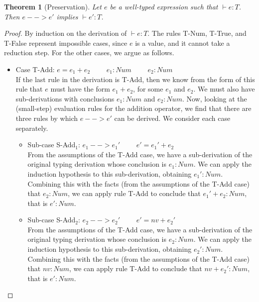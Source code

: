 \documentclass[tese,capa,english]{texufpel}
\newtheorem{theorem}{Theorem}
\begin{document}
\begin{theorem}[Preservation]
Let $e$ be a well-typed expression such that $\vdash e : T$. Then $e --> e'$ implies $\vdash e' : T$.
\end{theorem}

\begin{proof}
  By induction on the derivation of $\vdash e : T$. The rules {\footnotesize\textrm{T-Num}}, {\footnotesize\textrm{T-True}}, and {\footnotesize\textrm{T-False}} represent impossible cases, since $e$ is a value, and it cannot take a reduction step. For the other cases, we argue as follows.
\begin{itemize}
\item Case {\footnotesize\textrm{T-Add}}: $e = e_1 + e_2$ \ \ \ \ $e_1 : Num$ \ \ \ \ $e_2 : Num$ \vspace{5pt} \\
If the last rule in the derivation is {\footnotesize\textrm{T-Add}}, then we know from the form of this rule that $e$ must have the form $e_1 + e_2$, for some $e_1$ and $e_2$. We must also have sub-derivations with conclusions $e_1 : Num$ and $e_2 : Num$. Now, looking at the (small-step) evaluation rules for the addition operator, we find that there are three rules by which $e --> e'$ can be derived. We consider each case separately.
\begin{itemize}
\item Sub-case {\footnotesize\textrm{S-Add$_1$}}: $e_1 --> e_1'$ \ \ \ \ $e' = e_1' + e_2$ \vspace{4pt} \\
From the assumptions of the {\footnotesize\textrm{T-Add}} case, we have a sub-derivation of the original typing derivation whose conclusion is $e_1 : Num$. We can apply the induction hypothesis to this sub-derivation, obtaining $e_1' : Num$. Combining this with the facts (from the assumptions of the {\footnotesize\textrm{T-Add}} case) that $e_2 : Num$, we can apply rule {\footnotesize\textrm{T-Add}} to conclude that $e_1' + e_2 : Num$, that is $e' : Num$.
\item Sub-case {\footnotesize\textrm{S-Add$_2$}}: $e_2 --> e_2'$ \ \ \ \ $e' = nv + e_2'$ \vspace{4pt} \\
From the assumptions of the {\footnotesize\textrm{T-Add}} case, we have a sub-derivation of the original typing derivation whose conclusion is $e_2 : Num$. We can apply the induction hypothesis to this sub-derivation, obtaining $e_2' : Num$. Combining this with the facts (from the assumptions of the {\footnotesize\textrm{T-Add}} case) that $nv : Num$, we can apply rule {\footnotesize\textrm{T-Add}} to conclude that $nv + e_2' : Num$, that is $e' : Num$.

\end{itemize}
\end{itemize}
\end{proof}
\end{document}
